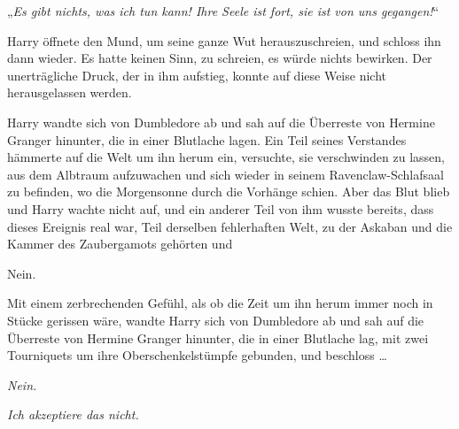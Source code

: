 „\emph{Es gibt nichts, was ich tun kann! Ihre Seele ist fort, sie ist von uns gegangen!}“

Harry öffnete den Mund, um seine ganze Wut herauszuschreien, und schloss ihn dann wieder. Es hatte keinen Sinn, zu schreien, es würde nichts bewirken. Der unerträgliche Druck, der in ihm aufstieg, konnte auf diese Weise nicht herausgelassen werden.

Harry wandte sich von Dumbledore ab und sah auf die Überreste von Hermine Granger hinunter, die in einer Blutlache lagen. Ein Teil seines Verstandes hämmerte auf die Welt um ihn herum ein, versuchte, sie verschwinden zu lassen, aus dem Albtraum aufzuwachen und sich wieder in seinem Ravenclaw-Schlafsaal zu befinden, wo die Morgensonne durch die Vorhänge schien. Aber das Blut blieb und Harry wachte nicht auf, und ein anderer Teil von ihm wusste bereits, dass dieses Ereignis real war, Teil derselben fehlerhaften Welt, zu der Askaban und die Kammer des Zaubergamots gehörten und

Nein.

Mit einem zerbrechenden Gefühl, als ob die Zeit um ihn herum immer noch in Stücke gerissen wäre, wandte Harry sich von Dumbledore ab und sah auf die Überreste von Hermine Granger hinunter, die in einer Blutlache lag, mit zwei Tourniquets um ihre Oberschenkelstümpfe gebunden, und beschloss …

\emph{Nein.}

\emph{Ich akzeptiere das nicht.}

